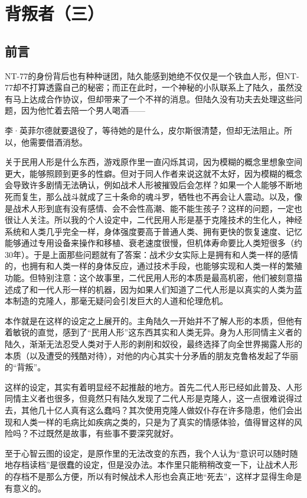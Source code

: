 \chapter{背叛者（三）}

\section*{前言}
NT-77的身份背后也有种种谜团，陆久能感到她绝不仅仅是一个铁血人形，但NT-77却不打算透露自己的秘密；而正在此时，一个神秘的小队联系上了陆久，虽然没有马上达成合作协议，但却带来了一个不祥的消息。但陆久没有功夫去处理这些问题，因为他忙着去陪一个男人喝酒——

李·英菲尔德就要退役了，等待她的是什么，皮尔斯很清楚，但却无法阻止。所以，他需要借酒消愁。

\lineseparator

关于民用人形是什么东西，游戏原作里一直闪烁其词，因为模糊的概念里想象空间更大，能够照顾到更多的性癖。但对于同人作者来说这就不太好，因为模糊的概念会导致许多剧情无法确认，例如战术人形被摧毁后会怎样？如果一个人能够不断地死而复生，那么战斗就成了三十条命的魂斗罗，牺牲也不再会让人震动。以及，像是战术人形到底有没有感情、会不会性高潮、能不能生孩子？这样的问题，一定也很让人关注。所以我的个人设定中，二代民用人形是基于克隆技术的生化人，神经系统和人类几乎完全一样，身体强度要高于普通人类、拥有更快的恢复速度、记忆能够通过专用设备来操作和移植、衰老速度很慢，但机体寿命要比人类短很多（约30年）。于是上面那些问题就有了答案：战术少女实际上是拥有和人类一样的感情的，也拥有和人类一样的身体反应，通过技术手段，也能够实现和人类一样的繁殖功能。但特别注意：这个故事里，二代民用人形的本质是最高机密，他们被刻意描述成了和一代人形一样的机器，因为如果人们知道了二代人形是以真实的人类为蓝本制造的克隆人，那毫无疑问会引发巨大的人道和伦理危机。

本作就是在这样的设定之上展开的。主角陆久一开始并不了解人形的本质，但他有着敏锐的直觉，感到了“民用人形”这东西其实和人类无异。身为人形同情主义者的陆久，渐渐无法忍受人类对于人形的剥削和奴役，最终选择了向全世界揭露人形的本质（以及遭受的残酷对待），对他的内心其实十分矛盾的朋友克鲁格发起了华丽的“背叛”。

这样的设定，其实有着明显经不起推敲的地方。首先二代人形已经如此普及、人形同情主义者也很多，但竟然只有陆久发现了二代人形是克隆人，这一点很难说得过去，其他几十亿人真有这么蠢吗？其次使用克隆人做奴仆存在许多隐患，他们会出现和人类一样的毛病比如疾病之类的，只是为了真实的情感体验，值得冒这样的风险吗？不过既然是故事，有些事不要深究就好。

至于心智云图的设定，是原作里的无法改变的东西，我个人认为“意识可以随时随地存档读档”是很蠢的设定，但是没办法。本作里只能稍稍改变一下，让战术人形的存档不是那么方便，所以有时候战术人形也会真正地“死去”，这样才显得生命是有意义的。

